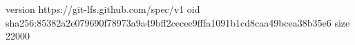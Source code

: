 version https://git-lfs.github.com/spec/v1
oid sha256:85382a2e079690f78973a9a49bff2cecee9fffa1091b1cd8caa49bcea38b35e6
size 22000
